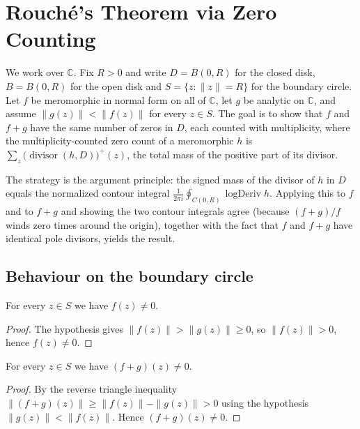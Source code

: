 


\section{Rouché's Theorem via Zero Counting}

We work over $\mathbb{C}$. Fix $R > 0$ and write
$D = \overline{B}(0,R)$ for the closed disk, $B = B(0,R)$ for the open disk and
$S = \{z : \|z\| = R\}$ for the boundary circle. Let $f$ be meromorphic in
normal form on all of $\mathbb{C}$, let $g$ be analytic on $\mathbb{C}$, and
assume $\|g(z)\| < \|f(z)\|$ for every $z \in S$. The goal is to show that $f$
and $f+g$ have the same number of zeros in $D$, each counted with multiplicity,
where the multiplicity-counted zero count of a meromorphic $h$ is
$\sum_z \big(\operatorname{divisor}(h, D)\big)^{+}(z)$, the total mass of the
positive part of its divisor.

The strategy is the argument principle: the signed mass of the divisor of $h$ in
$D$ equals the normalized contour integral $\frac{1}{2\pi i}\oint_{C(0,R)}
\operatorname{logDeriv} h$. Applying this to $f$ and to $f+g$ and showing the two
contour integrals agree (because $(f+g)/f$ winds zero times around the origin),
together with the fact that $f$ and $f+g$ have identical pole divisors, yields
the result.

\subsection{Behaviour on the boundary circle}

\begin{lemma}
    \label{lem:f-ne-zero-sphere}
    \leanok
    For every $z \in S$ we have $f(z) \neq 0$.
\end{lemma}
\begin{proof}
    The hypothesis gives $\|f(z)\| > \|g(z)\| \ge 0$, so $\|f(z)\| > 0$, hence
    $f(z) \neq 0$.
\end{proof}

\begin{lemma}
    \label{lem:fg-ne-zero-sphere}
    \leanok
    For every $z \in S$ we have $(f+g)(z) \neq 0$.
\end{lemma}
\begin{proof}
    By the reverse triangle inequality
    $\|(f+g)(z)\| \ge \|f(z)\| - \|g(z)\| > 0$ using the hypothesis
    $\|g(z)\| < \|f(z)\|$. Hence $(f+g)(z) \neq 0$.
\end{proof}

